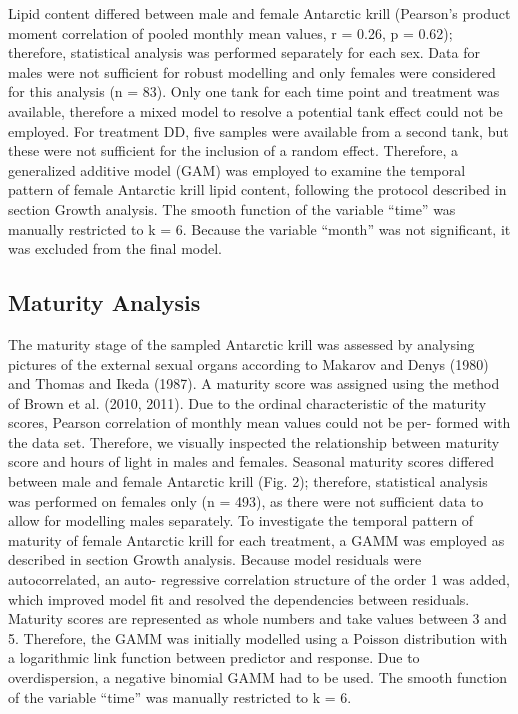 Lipid content differed between male and female Antarctic krill (Pearson’s
product moment correlation of pooled monthly mean values, r = 0.26, p = 0.62);
therefore, statistical analysis was performed separately for each sex. Data for
males were not sufficient for robust modelling and only females were considered
for this analysis (n = 83). Only one tank for each time point and treatment was
available, therefore a mixed model to resolve a potential tank effect could not
be employed. For treatment DD, five samples were available from a second tank,
but these were not sufficient for the inclusion of a random effect. Therefore,
a generalized additive model (GAM) was employed to examine the temporal pattern
of female Antarctic krill lipid content, following the protocol described in
section Growth analysis. The smooth function of the variable “time” was
manually restricted to k = 6. Because the variable “month” was not significant,
it was excluded from the final model.

\subsection{Maturity Analysis}

The maturity stage of the sampled Antarctic krill was assessed by analysing
pictures of the external sexual organs according to Makarov and Denys (1980)
and Thomas and Ikeda (1987). A maturity score was assigned using the method of
Brown et al. (2010, 2011). Due to the ordinal characteristic of the maturity
scores, Pearson correlation of monthly mean values could not be per- formed
with the data set. Therefore, we visually inspected the relationship between
maturity score and hours of light in males and females. Seasonal maturity
scores differed between male and female Antarctic krill (Fig. 2); therefore,
statistical analysis was performed on females only (n = 493), as there were not
sufficient data to allow for modelling males separately. To investigate the
temporal pattern of maturity of female Antarctic krill for each treatment, a
GAMM was employed as described in section Growth analysis. Because model
residuals were autocorrelated, an auto- regressive correlation structure of the
order 1 was added, which improved model fit and resolved the dependencies
between residuals. Maturity scores are represented as whole numbers and take
values between 3 and 5. Therefore, the GAMM was initially modelled using a
Poisson distribution with a logarithmic link function between predictor and
response. Due to overdispersion, a negative binomial GAMM had to be used. The
smooth function of the variable “time” was manually restricted to k = 6. 

